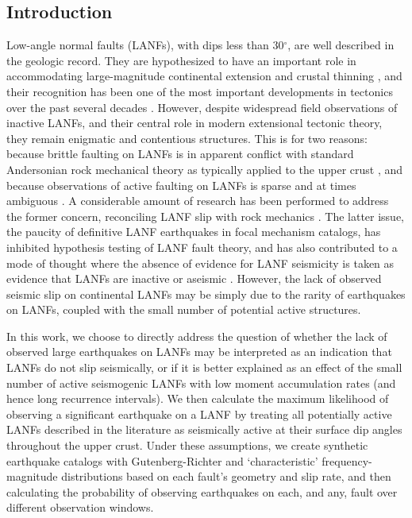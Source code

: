 \documentclass[twocolumn,grl]{AGUTeX}
\begin{document}
\begin{article}

\section{Introduction}
Low-angle normal faults (LANFs), with dips less than 30$^\circ$, are
well described in the geologic record. They are hypothesized to have
an important role in accommodating large-magnitude continental
extension \citep{howard1987crustal} and crustal thinning
\citep{lister1986detachment}, and their recognition has been one of
the most important developments in tectonics over the past several
decades \citep{wernicke2009detachment}. However, despite widespread
field observations of inactive LANFs, and their central role in modern
extensional tectonic theory, they remain enigmatic and contentious
structures. This is for two reasons: because brittle faulting on LANFs
is in apparent conflict with standard Andersonian rock mechanical
theory as typically applied to the upper crust
\citep{axen2004lanfmech}, and because observations of active faulting
on LANFs is sparse and at times ambiguous \citep{wernicke1995seis}. A
considerable amount of research has been performed to address the
former concern, reconciling LANF slip with rock mechanics \citep [e.g.,]
[]{collettini2011lanfmech}. The latter issue, the paucity of definitive LANF
earthquakes in focal mechanism catalogs, has inhibited hypothesis testing of 
LANF fault theory, and has also contributed to a mode of thought where the 
absence of evidence for LANF seismicity is taken as evidence that LANFs
are inactive or aseismic \citep{jackson1987,
  collettinisibson2001}. However, the lack of observed seismic slip on
continental LANFs may be simply due to the rarity of earthquakes on
LANFs, coupled with the small number of potential active structures.

In this work, we choose to directly address the question of whether
the lack of observed large earthquakes on LANFs may be 
interpreted as an indication that
LANFs do not slip seismically, or if it is better explained as an
effect of the small number of active seismogenic LANFs with low moment
accumulation rates (and hence long recurrence intervals). 
We then calculate the maximum likelihood of observing a significant
earthquake on a LANF by treating all potentially active LANFs described in the 
literature as seismically active at their surface dip angles 
throughout the upper crust. %
Under these assumptions, we create synthetic earthquake catalogs with
Gutenberg-Richter and `characteristic' frequency-magnitude distributions
based on each fault's geometry and slip rate, and then calculating the
probability of observing earthquakes on each, and any, fault over different
observation windows.


\end{article}
\end{document}
